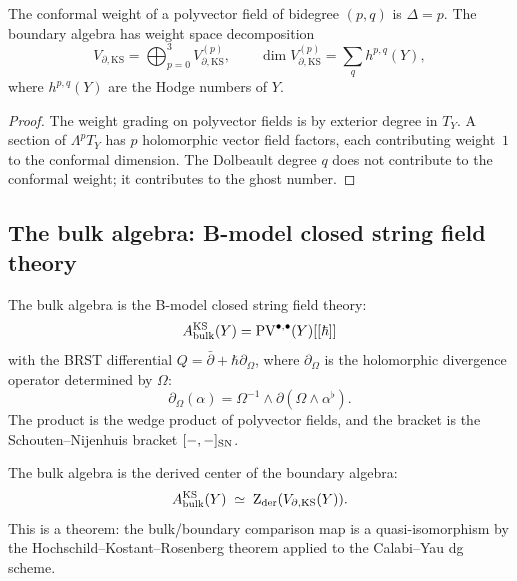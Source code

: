 \begin{proposition}
The conformal weight of a polyvector field of bidegree $(p,q)$
is $\Delta=p$. The boundary algebra has weight space decomposition
\begin{equation}%
V_{\partial,\mathrm{KS}} = \bigoplus_{p=0}^{3}
V_{\partial,\mathrm{KS}}^{(p)},
\qquad
\dim V_{\partial,\mathrm{KS}}^{(p)}
= \sum_q h^{p,q}(Y),
\end{equation}
where $h^{p,q}(Y)$ are the Hodge numbers of $Y$.
\end{proposition}

\begin{proof}
The weight grading on polyvector fields is by exterior degree in
$T_Y$. A section of $\Lambda^p T_Y$ has $p$ holomorphic vector
field factors, each contributing weight~$1$ to the conformal
dimension. The Dolbeault degree $q$ does not contribute to the
conformal weight; it contributes to the ghost number.
\end{proof}


\subsection{The bulk algebra: B-model closed string field theory}

\begin{definition}
The bulk algebra is the B-model closed string field theory:
\begin{equation}%
A_{\mathrm{bulk}}^{\mathrm{KS}}(Y)
= \PV^{\bullet,\bullet}(Y)[[\hbar]]
\end{equation}
with the BRST differential $Q=\bar\partial+\hbar\partial_\Omega$,
where $\partial_\Omega$ is the holomorphic divergence operator
determined by $\Omega$:
\begin{equation}%
\partial_\Omega(\alpha)
= \Omega^{-1}\wedge\partial(\Omega\wedge\alpha^\flat).
\end{equation}
The product is the wedge product of polyvector fields, and the
bracket is the Schouten--Nijenhuis bracket $[-,-]_{\mathrm{SN}}$.
\end{definition}

\begin{theorem}
The bulk algebra is the derived center of the boundary algebra:
\begin{equation}%
A_{\mathrm{bulk}}^{\mathrm{KS}}(Y)
\;\simeq\;
\Zder(V_{\partial,\mathrm{KS}}(Y)).
\end{equation}
This is a theorem: the bulk/boundary comparison map is a
quasi-isomorphism by the Hochschild--Kostant--Rosenberg theorem
applied to the Calabi--Yau dg scheme.
\end{theorem}

